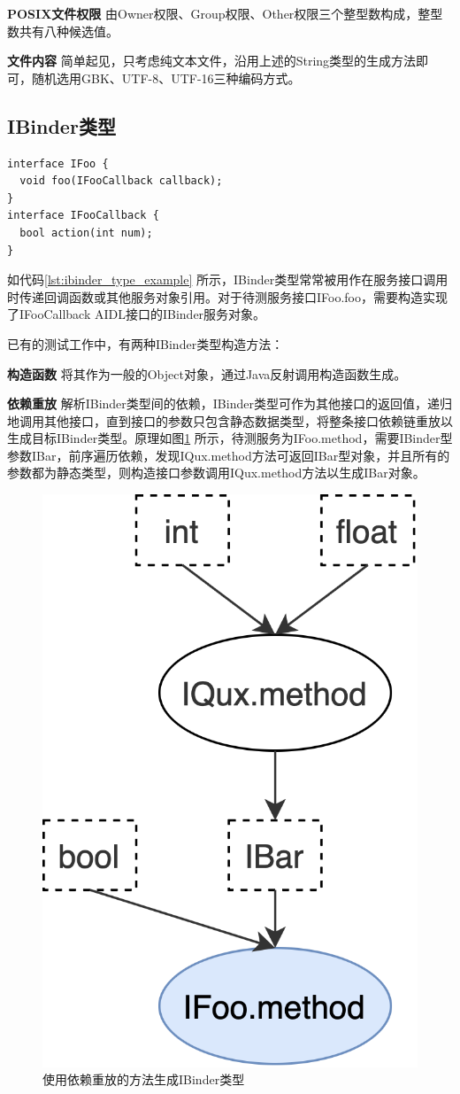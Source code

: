\documentclass[winfonts,master,twoside]{njuthesis}
\begin{document}
\textbf{POSIX文件权限} \quad 由Owner权限、Group权限、Other权限三个整型数构成，整型数共有八种候选值。

\textbf{文件内容} \quad 简单起见，只考虑纯文本文件，沿用上述的String类型的生成方法即可，随机选用GBK、UTF-8、UTF-16三种编码方式。


\subsection{IBinder类型}

\begin{lstlisting}[caption={IBinder类型AIDL接口定义},label={lst:ibinder_type_example}]
interface IFoo {
  void foo(IFooCallback callback);
}
interface IFooCallback {
  bool action(int num);
}
\end{lstlisting}

如代码\ref{lst:ibinder_type_example} 所示，IBinder类型常常被用作在服务接口调用时传递回调函数或其他服务对象引用。对于待测服务接口IFoo.foo，需要构造实现了IFooCallback AIDL接口的IBinder服务对象。


已有的测试工作\cite{feng2016understanding}\cite{iannillo2017chizpurfle}\cite{liu2020fans}中，有两种IBinder类型构造方法：

\textbf{构造函数} \quad 将其作为一般的Object对象，通过Java反射调用构造函数生成。

\textbf{依赖重放} \quad 解析IBinder类型间的依赖，IBinder类型可作为其他接口的返回值，递归地调用其他接口，直到接口的参数只包含静态数据类型，将整条接口依赖链重放以生成目标IBinder类型。原理如图\ref{ibinder-dependency} 所示，待测服务为IFoo.method，需要IBinder型参数IBar，前序遍历依赖，发现IQux.method方法可返回IBar型对象，并且所有的参数都为静态类型，则构造接口参数调用IQux.method方法以生成IBar对象。

\begin{figure}
	\centering
	\includegraphics[width=.3\textwidth]{figure/4-fuzzer/ibinder-dependency.png}
	\caption{使用依赖重放的方法生成IBinder类型}
	\label{ibinder-dependency}
\end{figure}
\end{document}
